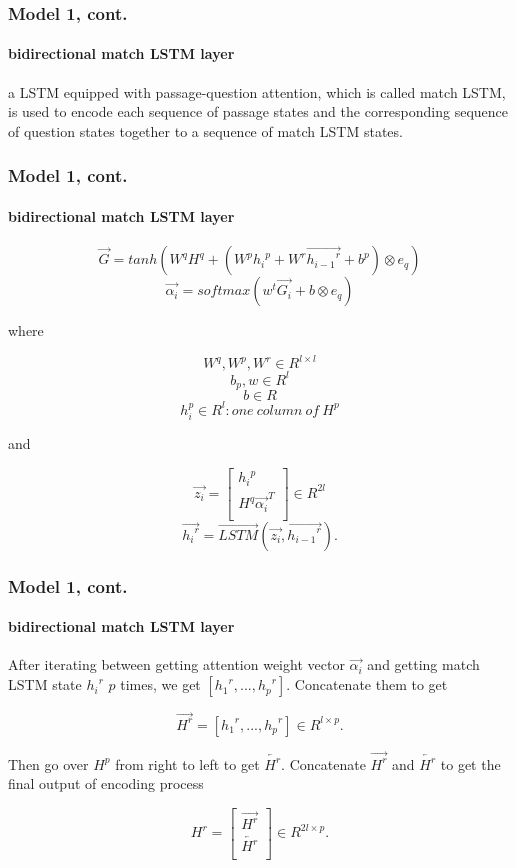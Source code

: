 \documentclass{beamer}
\begin{document}
\begin{frame} \frametitle{Model 1, cont.}\framesubtitle{bidirectional match LSTM layer}

a LSTM equipped with passage-question attention, which is called match LSTM, is used to encode each sequence of passage states and the corresponding sequence of question states together to a sequence of match LSTM states.


\end{frame}

\begin{frame} \frametitle{Model 1, cont.}\framesubtitle{bidirectional match LSTM layer}

    $$\overrightarrow{G} = tanh(W^qH^q + (W^p{h_i}^p + W^r\overrightarrow{{h_{i-1}}^r} + b^p) \otimes e_q)$$
    $$\overrightarrow{\alpha _i} = softmax(w^t\overrightarrow{G_i} + b \otimes e_q)$$


    where

    $$W^q, W^p, W^r\in R^{l \times l} $$
    $$b_p, w\in R^{l}  $$
    $$b \in R $$
    $${h_{i}^p}\in R^{l}: one\ column\ of\ H^p  $$

    and

    \[ \overrightarrow{z_i} =
    \begin{bmatrix}
    {h_i}^p \\
    H^q\overrightarrow{ {\alpha _i}}^T \\
    \end{bmatrix}
    \in R^{2l}
    \]
    $$\overrightarrow{{h_i}^r} = \overrightarrow{LSTM}(\overrightarrow{z_i}, \overrightarrow{{h_{i-1}}^r}).$$

\end{frame}

\begin{frame} \frametitle{Model 1, cont.}\framesubtitle{bidirectional match LSTM layer}
    After iterating between getting attention weight vector $\overrightarrow{\alpha _i}$ and getting match LSTM state ${{h_{i}}^r}$ $p$ times, we get $[{{h_{1}}^r}, ..., {{h_{p}}^r}]$. Concatenate them to get

    $$\overrightarrow{H^r} = [{{h_{1}}^r}, ..., {{h_{p}}^r}] \in R^{l \times p}.$$

    Then go over $H^p$ from right to left to get $\overleftarrow{H^r}$. Concatenate $\overrightarrow{H^r}$ and $\overleftarrow{H^r}$ to get the final output of encoding process

    \[ H^r =
    \begin{bmatrix}
    \overrightarrow{H^r} \\
    \overleftarrow{H^r} \\
    \end{bmatrix}
    \in R^{2l \times p}.
    \]
\end{frame}
\end{document}
